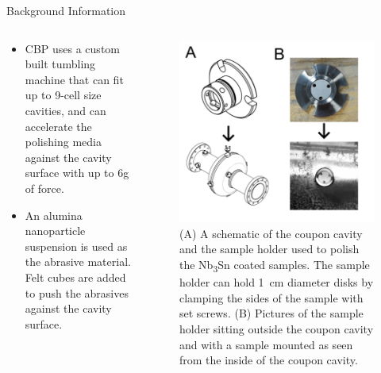 \documentclass{beamer}
\begin{document}
\begin{frame}{}
\begin{columns}[t]
\begin{column}{0.32\linewidth}
\begin{block}{\label{sec:backgroundinformation}Background Information}
\begin{columns}[t]
\begin{column}{0.45\columnwidth}
\begin{itemize}
                                \item CBP uses a custom built tumbling machine that can fit up to 9-cell size cavities, and can accelerate the polishing media against the cavity surface with up to 6g of force.
                                \item An alumina nanoparticle suspension is used as the abrasive material. Felt cubes are added to push the abrasives against the cavity surface.
                            \end{itemize}  
                        \end{column}
                        \begin{column}{0.45\columnwidth}
                            \begin{figure}[t]%
                                \centering%
                                \includegraphics[width=\columnwidth]{../doc/figs/Coupon_Cavity.png}%
                                \caption{(A) A schematic of the coupon cavity and the sample holder used to polish the Nb\textsubscript{3}Sn coated samples. The sample holder can hold 1~cm diameter disks by clamping the sides of the sample with set screws. (B) Pictures of the sample holder sitting outside the coupon cavity and with a sample mounted as seen from the inside of the coupon cavity.}%
                                \label{fig:couponcavity}%
                            \end{figure}

\end{column}
\end{columns}
\end{block}
\end{column}
\end{columns}
\end{frame}
\end{document}
